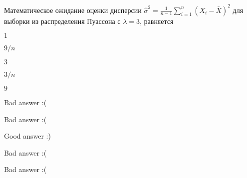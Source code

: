 
\begin{question}
Математическое ожидание оценки дисперсии
\(\hat \sigma^2=\frac{1}{n-1}\sum_{i=1}^{n}(X_i - \bar X)^2\) для
выборки из распределения Пуассона с \(\lambda = 3\), равняется
\begin{answerlist}
  \item \(1\)
  \item \(9/n\)
  \item \(3\)
  \item \(3/n\)
  \item \(9\)
\end{answerlist}
\end{question}

\begin{solution}
\begin{answerlist}
  \item Bad answer :(
  \item Bad answer :(
  \item Good answer :)
  \item Bad answer :(
  \item Bad answer :(
\end{answerlist}
\end{solution}

